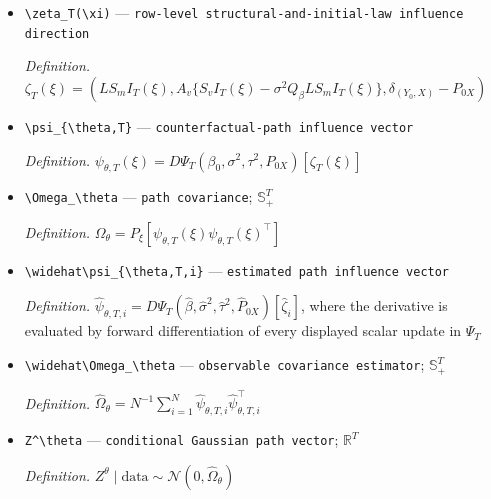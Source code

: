 \documentclass{article}
\begin{document}
\begin{itemize}
  \par\smallskip\noindent\emph{Definition.} \(\mathcal A_T\mathbb Z_T^{\mathrm{full}}=(LZ_m,A_v\{Z_v-\sigma^2Q_\beta LZ_m\},\mathbb G_{0X})\)
  \item \texttt{\textbackslash{}\allowbreak{}zeta\_\allowbreak{}T(\textbackslash{}\allowbreak{}xi)} --- \texttt{row-\allowbreak{}level structural-\allowbreak{}and-\allowbreak{}initial-\allowbreak{}law influence direction}
  \par\smallskip\noindent\emph{Definition.} \(\zeta_T(\xi)=(LS_mI_T(\xi),A_v\{S_vI_T(\xi)-\sigma^2Q_\beta LS_mI_T(\xi)\},\delta_{(Y_0,X)}-P_{0X})\)
  \item \texttt{\textbackslash{}\allowbreak{}psi\_\allowbreak{}\{\textbackslash{}\allowbreak{}theta,\allowbreak{}T\}\allowbreak{}} --- \texttt{counterfactual-\allowbreak{}path influence vector}
  \par\smallskip\noindent\emph{Definition.} \(\psi_{\theta,T}(\xi)=D\Psi_T(\beta_0,\sigma^2,\tau^2,P_{0X})[\zeta_T(\xi)]\)
  \item \texttt{\textbackslash{}\allowbreak{}Omega\_\allowbreak{}\textbackslash{}\allowbreak{}theta} --- \texttt{path covariance}; \(\mathbb S_+^T\)
  \par\smallskip\noindent\emph{Definition.} \(\Omega_\theta=P_\xi[\psi_{\theta,T}(\xi)\psi_{\theta,T}(\xi)^{\top}]\)
  \item \texttt{\textbackslash{}\allowbreak{}widehat\textbackslash{}\allowbreak{}psi\_\allowbreak{}\{\textbackslash{}\allowbreak{}theta,\allowbreak{}T,\allowbreak{}i\}\allowbreak{}} --- \texttt{estimated path influence vector}
  \par\smallskip\noindent\emph{Definition.} \(\widehat\psi_{\theta,T,i}=D\Psi_T(\widehat\beta,\widehat\sigma^2,\widehat\tau^2,\widehat P_{0X})[\widehat\zeta_i]\), where the derivative is evaluated by forward differentiation of every displayed scalar update in \(\Psi_T\)
  \item \texttt{\textbackslash{}\allowbreak{}widehat\textbackslash{}\allowbreak{}Omega\_\allowbreak{}\textbackslash{}\allowbreak{}theta} --- \texttt{observable covariance estimator}; \(\mathbb S_+^T\)
  \par\smallskip\noindent\emph{Definition.} \(\widehat\Omega_\theta=N^{-1}\sum_{i=1}^N\widehat\psi_{\theta,T,i}\widehat\psi_{\theta,T,i}^{\top}\)
  \item \texttt{Z\textasciicircum{}\textbackslash{}\allowbreak{}theta} --- \texttt{conditional Gaussian path vector}; \(\mathbb R^T\)
  \par\smallskip\noindent\emph{Definition.} \(Z^\theta\mid\text{data}\sim\mathcal N(0,\widehat\Omega_\theta)\)

\end{itemize}
\end{document}
